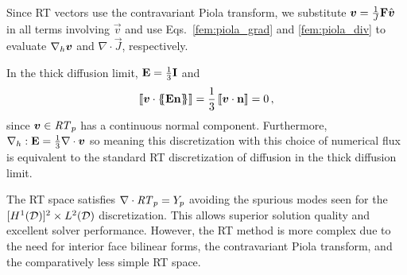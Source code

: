 \documentclass[../doc.tex]{subfiles}
\begin{document}
Since RT vectors use the contravariant Piola transform, we substitute $\boldsymbol{v} = \frac{1}{J}\boldsymbol{\mathrm{F}}\hat{\boldsymbol{v}}$ in all terms involving $\vec{v}$ and use Eqs.~\ref{fem:piola_grad} and \ref{fem:piola_div} to evaluate $\nabla_h\boldsymbol{v}$ and $\nabla\cdot\vec{J}$, respectively. 

In the thick diffusion limit, $\boldsymbol{\mathrm{E}} = \frac{1}{3}\boldsymbol{\mathrm{I}}$ and 
	\begin{equation}
		\left\llbracket\boldsymbol{v}\cdot\left\{\!\!\left\{\boldsymbol{\mathrm{E}}\boldsymbol{\mathrm{n}}\right\}\!\!\right\} \right\rrbracket = \frac{1}{3}\left\llbracket\boldsymbol{v}\cdot\boldsymbol{\mathrm{n}} \right\rrbracket = 0 \,, 
	\end{equation}
since $\boldsymbol{v} \in \mathit{RT}_p$ has a continuous normal component. Furthermore, $\nabla_h:\boldsymbol{\mathrm{E}} = \frac{1}{3}\nabla\cdot\boldsymbol{v}$ so meaning this discretization with this choice of numerical flux is equivalent to the standard RT discretization of diffusion in the thick diffusion limit. 

The RT space satisfies $\nabla\cdot\mathit{RT}_p = Y_p$ avoiding the spurious modes seen for the $[H^1(\mathcal{D})]^2 \times L^2(\mathcal{D})$ discretization. This allows superior solution quality and excellent solver performance. However, the RT method is more complex due to the need for interior face bilinear forms, the contravariant Piola transform, and the comparatively less simple RT space. 

\section{}
\end{document}
